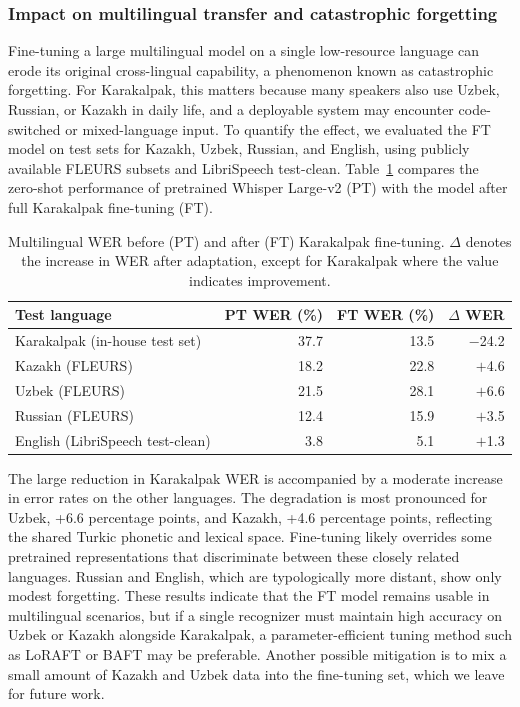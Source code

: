 \documentclass[11pt]{article}
\begin{document}
\subsubsection{Impact on multilingual transfer and catastrophic forgetting}

Fine-tuning a large multilingual model on a single low-resource language can erode its original cross-lingual capability, a phenomenon known as catastrophic forgetting. For Karakalpak, this matters because many speakers also use Uzbek, Russian, or Kazakh in daily life, and a deployable system may encounter code-switched or mixed-language input. To quantify the effect, we evaluated the FT model on test sets for Kazakh, Uzbek, Russian, and English, using publicly available FLEURS subsets and LibriSpeech test-clean. Table~\ref{tab:multilingual} compares the zero-shot performance of pretrained Whisper Large-v2 (PT) with the model after full Karakalpak fine-tuning (FT).

\begin{table}[H]
\centering
\caption{Multilingual WER before (PT) and after (FT) Karakalpak fine-tuning. $\Delta$ denotes the increase in WER after adaptation, except for Karakalpak where the value indicates improvement.}
\label{tab:multilingual}
\begin{tabular}{lrrr}
\toprule
Test language & PT WER (\%) & FT WER (\%) & $\Delta$ WER \\
\midrule
Karakalpak (in-house test set) & 37.7 & 13.5 & $-$24.2 \\
Kazakh (FLEURS) & 18.2 & 22.8 & $+$4.6 \\
Uzbek (FLEURS) & 21.5 & 28.1 & $+$6.6 \\
Russian (FLEURS) & 12.4 & 15.9 & $+$3.5 \\
English (LibriSpeech test-clean) & 3.8 & 5.1 & $+$1.3 \\
\bottomrule
\end{tabular}
\end{table}

The large reduction in Karakalpak WER is accompanied by a moderate increase in error rates on the other languages. The degradation is most pronounced for Uzbek, +6.6 percentage points, and Kazakh, +4.6 percentage points, reflecting the shared Turkic phonetic and lexical space. Fine-tuning likely overrides some pretrained representations that discriminate between these closely related languages. Russian and English, which are typologically more distant, show only modest forgetting. These results indicate that the FT model remains usable in multilingual scenarios, but if a single recognizer must maintain high accuracy on Uzbek or Kazakh alongside Karakalpak, a parameter-efficient tuning method such as LoRAFT or BAFT may be preferable. Another possible mitigation is to mix a small amount of Kazakh and Uzbek data into the fine-tuning set, which we leave for future work.
\end{document}
